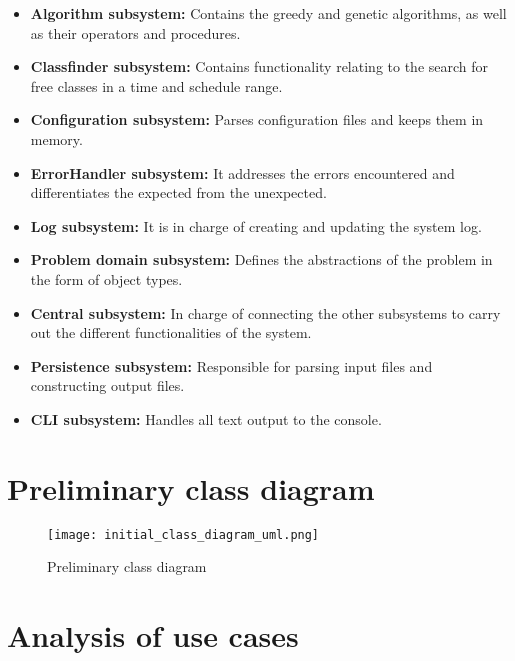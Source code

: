 \begin{itemize}

    \item \textbf{Algorithm subsystem:} Contains the greedy and genetic algorithms, as well as their operators and procedures.

    \item \textbf{Classfinder subsystem:} Contains functionality relating to the search for free classes in a time and schedule range.

    \item \textbf{Configuration subsystem:} Parses configuration files and keeps them in memory.

    \item \textbf{ErrorHandler subsystem:} It addresses the errors encountered and differentiates the expected from the unexpected.

    \item \textbf{Log subsystem:} It is in charge of creating and updating the system log.

    \item \textbf{Problem domain subsystem:} Defines the abstractions of the problem in the form of object types.

    \item \textbf{Central subsystem:} In charge of connecting the other subsystems to carry out the different functionalities of the system.

    \item \textbf{Persistence subsystem:} Responsible for parsing input files and constructing output files.

    \item \textbf{CLI subsystem:} Handles all text output to the console.

\end{itemize}




\section{Preliminary class diagram}


\begin{figure}[H]
    \caption{Preliminary class diagram}
  \centering
  \texttt{[image: initial\_class\_diagram\_uml.png]}
\end{figure}




\section{Analysis of use cases}

